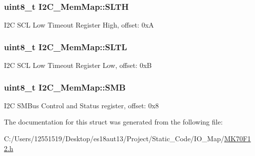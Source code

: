 \subsubsection[{S\+L\+T\+H}]{\setlength{\rightskip}{0pt plus 5cm}uint8\+\_\+t I2\+C\+\_\+\+Mem\+Map\+::\+S\+L\+T\+H}\label{struct_i2_c___mem_map_aac56d4be80ad622d7bf85bdd8c29504c}
I2\+C S\+C\+L Low Timeout Register High, offset\+: 0x\+A \hypertarget{struct_i2_c___mem_map_afd5aa3cef3245893addeb55556e1ceff}{}
\subsubsection[{S\+L\+T\+L}]{\setlength{\rightskip}{0pt plus 5cm}uint8\+\_\+t I2\+C\+\_\+\+Mem\+Map\+::\+S\+L\+T\+L}\label{struct_i2_c___mem_map_afd5aa3cef3245893addeb55556e1ceff}
I2\+C S\+C\+L Low Timeout Register Low, offset\+: 0x\+B \hypertarget{struct_i2_c___mem_map_a14ca29af4960a6588080acb71f62d5fa}{}
\subsubsection[{S\+M\+B}]{\setlength{\rightskip}{0pt plus 5cm}uint8\+\_\+t I2\+C\+\_\+\+Mem\+Map\+::\+S\+M\+B}\label{struct_i2_c___mem_map_a14ca29af4960a6588080acb71f62d5fa}
I2\+C S\+M\+Bus Control and Status register, offset\+: 0x8 

The documentation for this struct was generated from the following file\+:\begin{DoxyCompactItemize}
\item 
C\+:/\+Users/12551519/\+Desktop/es18aut13/\+Project/\+Static\+\_\+\+Code/\+I\+O\+\_\+\+Map/\hyperlink{_m_k70_f12_8h}{M\+K70\+F12.\+h}\end{DoxyCompactItemize}
